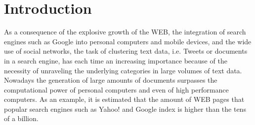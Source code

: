 \documentclass[10pt]{article}
\begin{document}
\section{Introduction}
As a consequence of the explosive growth of the WEB, the integration of search engines such as Google into personal computers and mobile devices, and the wide use of social networks, the task of clustering text data, i.e. Tweets or documents in a search engine, has each time an increasing importance because of the necessity of unraveling the underlying categories in large volumes of text data. Nowadays the generation of large amounts of documents surpasses the computational power of personal computers and even of high performance computers.
As an example, it is estimated that the amount of WEB pages that popular search engines such as Yahoo! and Google index is higher than the tens of a billion.
\end{document}
